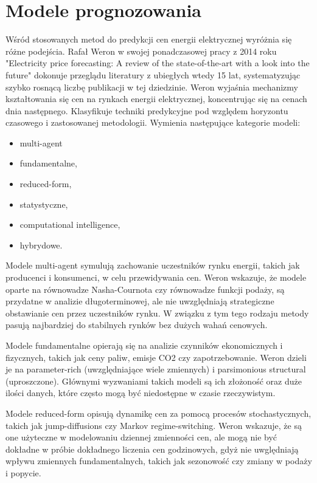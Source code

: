 \section{Modele prognozowania}
\label{sec:modele_prognozowania_literatura}

Wśród stosowanych metod do predykcji cen energii elektrycznej wyróżnia się różne podejścia. Rafał Weron w swojej ponadczasowej pracy z 2014 roku "Electricity price forecasting: A review of the state-of-the-art with a look into the future" \cite{WERON20141030} dokonuje przeglądu literatury z ubiegłych wtedy 15 lat, systematyzując szybko rosnącą liczbę publikacji w tej dziedzinie. Weron wyjaśnia mechanizmy kształtowania się cen na rynkach energii elektrycznej, koncentrując się na cenach dnia następnego. Klasyfikuje techniki predykcyjne pod względem horyzontu czasowego i zastosowanej metodologii. Wymienia następujące kategorie modeli: 
\begin{itemize}
    \item multi-agent
    \item fundamentalne,
    \item reduced-form,
    \item statystyczne,
    \item computational intelligence,
    \item hybrydowe.
\end{itemize}

Modele multi-agent symulują zachowanie uczestników rynku energii, takich jak producenci i konsumenci, w celu przewidywania cen. Weron \cite{WERON20141030} wskazuje, że modele oparte na równowadze Nasha-Cournota czy równowadze funkcji podaży, są przydatne w analizie długoterminowej, ale nie uwzględniają strategiczne obstawianie cen przez uczestników rynku. W związku z tym tego rodzaju metody pasują najbardziej do stabilnych rynków bez dużych wahań cenowych. 

Modele fundamentalne opierają się na analizie czynników ekonomicznych i fizycznych, takich jak ceny paliw, emisje CO2 czy zapotrzebowanie. Weron \cite{WERON20141030} dzieli je na parameter-rich (uwzględniające wiele zmiennych) i parsimonious structural (uproszczone). Głównymi wyzwaniami takich modeli są ich złożoność oraz duże ilości danych, które często mogą być niedostępne w czasie rzeczywistym. 

Modele reduced-form opisują dynamikę cen za pomocą procesów stochastycznych, takich jak jump-diffusions czy Markov regime-switching. Weron \cite{WERON20141030} wskazuje, że są one użyteczne w modelowaniu dziennej zmienności cen, ale mogą nie być dokładne w próbie dokładnego liczenia cen godzinowych, gdyż nie uwględniają wpływu zmiennych fundamentalnych, takich jak sezonowość czy zmiany w podaży i popycie.

